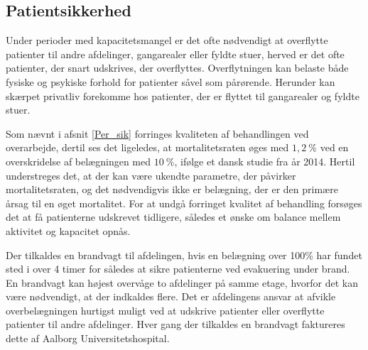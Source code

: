 \subsection{Patientsikkerhed}
Under perioder med kapacitetsmangel er det ofte nødvendigt at overflytte patienter til andre afdelinger, gangarealer eller fyldte stuer, herved er det ofte patienter, der snart udskrives, der overflyttes.  Overflytningen kan belaste både fysiske og psykiske forhold for patienter såvel som pårørende\cite{Heidmann2014}. Herunder kan skærpet privatliv forekomme hos patienter, der er flyttet til gangarealer og fyldte stuer\cite{Madsen2014}. 

Som nævnt i afsnit \ref{Per_sik} forringes kvaliteten af behandlingen ved overarbejde, dertil ses det ligeledes, at mortalitetsraten øges med $1,2~\%$ ved en overskridelse af belægningen med $10~\%$, ifølge et dansk studie fra år 2014\cite{Madsen2014}. Hertil understreges det, at der kan være ukendte parametre, der påvirker mortalitetsraten, og det nødvendigvis ikke er belægning, der er den primære årsag til en øget mortalitet. For at undgå forringet kvalitet af behandling forsøges det at få patienterne udskrevet tidligere, således et ønske om balance mellem aktivitet og kapacitet opnås.


Der tilkaldes en brandvagt til afdelingen, hvis en belægning over 100\% har fundet sted i over 4 timer for således at sikre patienterne ved evakuering under brand. En brandvagt kan højest overvåge to afdelinger på samme etage, hvorfor det kan være nødvendigt, at der indkaldes flere. Det er afdelingens ansvar at afvikle overbelægningen hurtigst muligt ved at udskrive patienter eller overflytte patienter til andre afdelinger.  Hver gang der tilkaldes en brandvagt faktureres dette af Aalborg Universitetshospital.\cite{Beredskab2016}


